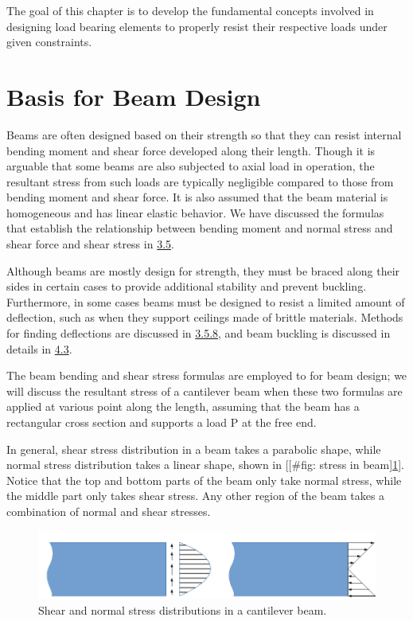 \documentclass[a4paper,openany,12pt]{book}
\begin{document}
{{The goal of this chapter is to develop the fundamental concepts involved
in designing load bearing elements to properly resist their respective
loads under given constraints.

\section{Basis for Beam Design}
\label{basis-for-beam-design}
Beams are often designed based on their strength so that they can resist
internal bending moment and shear force developed along their length.
Though it is arguable that some beams are also subjected to axial load
in operation, the resultant stress from such loads are typically
negligible compared to those from bending moment and shear force. It is
also assumed that the beam material is homogeneous and has linear
elastic behavior. We have discussed the formulas that establish the
relationship between bending moment and normal stress and shear force
and shear stress in \hyperref[section: bending]{3.5}.

Although beams are mostly design for strength, they must be braced along
their sides in certain cases to provide additional stability and prevent
buckling. Furthermore, in some cases beams must be designed to resist a
limited amount of deflection, such as when they support ceilings made of
brittle materials. Methods for finding deflections are discussed in
\hyperref[subsection: beam deflection]{3.5.8}, and beam buckling is discussed
in details in \hyperref[section: buckling]{4.3}.

The beam bending and shear stress formulas are employed to for beam
design; we will discuss the resultant stress of a cantilever beam when
these two formulas are applied at various point along the length,
assuming that the beam has a rectangular cross section and supports a
load P at the free end.

In general, shear stress distribution in a beam takes a parabolic shape,
while normal stress distribution takes a linear shape, shown in
[[\#fig: stress in beam]\ref{fig: stress in beam}]. Notice that the top and
bottom parts of the beam only take normal stress, while the middle part
only takes shear stress. Any other region of the beam takes a
combination of normal and shear stresses.


\begin{figure}[htbp]
\centering
\includegraphics[width=.9\linewidth]{pictures/Simple-load-bearing/stress-in-beam.pdf}
\caption{\label{fig: stress in beam}
Shear and normal stress distributions in a cantilever beam.}
\end{figure}

}}
\end{document}
